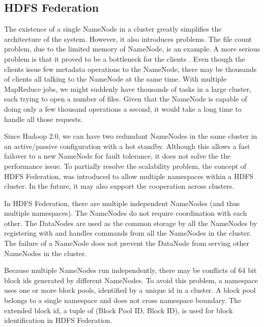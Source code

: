 \documentclass[11pt]{book}
\begin{document}
\subsection{HDFS Federation}
The existence of a single NameNode in a cluster greatly simplifies the architecture of the system. However, it also introduces problems. The file count problem, due to the limited memory of NameNode, is an example. A more serious problem is that it proved to be a bottleneck for the clients \cite{McKusick:2009:GEF}. Even though the clients issue few metadata operations to the NameNode, there may be thousands of clients all talking to the NameNode at the same time. With multiple MapReduce jobs, we might suddenly have thousands of tasks in a large cluster, each trying to open a number of files. Given that the NameNode is capable of doing only a few thousand operations a second, it would take a long time to handle all those requests.

Since Hadoop 2.0, we can have two redundant NameNodes in the same cluster in an active/passive configuration with a hot standby. Although this allows a fast failover to a new NameNode for fault tolerance, it does not solve the the performance issue. To partially resolve the scalability problem, the concept of HDFS Federation, was introduced to allow multiple namespaces within a HDFS cluster. In the future, it may also support the cooperation across clusters.

In HDFS Federation, there are multiple independent NameNodes (and thus multiple namespaces). The NameNodes do not require coordination with each other. The DataNodes are used as the common storage by all the NameNodes by registering with and handles commands from all the NameNodes in the cluster. The failure of a NameNode does not prevent the DataNode from serving other NameNodes in the cluster.

Because multiple NameNodes run independently, there may be conflicts of 64 bit block ids generated by different NameNodes. To avoid this problem, a namespace uses one or more block pools, identified by a unique id in a cluster. A block pool belongs to a single namespace and does not cross namespace boundary. The extended block id, a tuple of (Block Pool ID, Block ID), is used for block identification in HDFS Federation.
\end{document}
